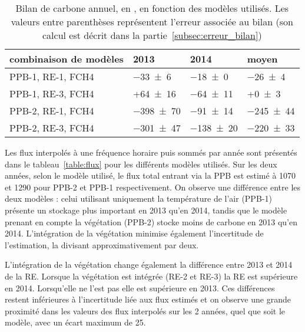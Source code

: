 \begin{table}
\centering
\caption{Bilan de carbone annuel, en \si{\gcma}, en fonction des modèles utilisés. Les valeurs entre parenthèses représentent l'erreur associée au bilan (son calcul est décrit dans la partie~\ref{subsec:erreur_bilan})}
\label{table:bdc}
\begin{tabular}{llll}\toprule
combinaison de modèles & 2013 & 2014 & moyen \\ \midrule
PPB-1, RE-1, FCH4 &  \num{-33(6)} & \num{-18(0)} & \num{-26(4)} \\
PPB-1, RE-3, FCH4 &  +\num{64(16)} & \num{-64(11)} & +\num{0(3)} \\
PPB-2, RE-1, FCH4 &  \num{-398(70)} & \num{-91(14)} & \num{-245(44)} \\
PPB-2, RE-3, FCH4 &  \num{-301(47)} & \num{-138(20)} & \num{-220(33)} \\
\bottomrule
\end{tabular}
\end{table}

Les flux interpolés à une fréquence horaire puis sommés par année sont présentés dans le tableau~\ref{table:flux} pour les différents modèles utilisés.
Sur les deux années, selon le modèle utilisé, le flux total entrant via la PPB est estimé à 1070 et \SI{1290}{\gcma} pour PPB-2 et PPB-1 respectivement.
On observe une différence entre les deux modèles : 
celui utilisant uniquement la température de l'air (PPB-1) présente un stockage plus important en 2013 qu'en 2014, tandis que le modèle prenant en compte la végétation (PPB-2) stocke moins de carbone en 2013 qu'en 2014.
L'intégration de la végétation minimise également l'incertitude de l'estimation, la divisant approximativement par deux.

L'intégration de la végétation change également la différence entre 2013 et 2014 de la RE.
Lorsque la végétation est intégrée (RE-2 et RE-3) la RE est supérieure en 2014.
Lorsqu'elle ne l'est pas elle est supérieure en 2013.
Ces différences restent inférieures à l'incertitude liée aux flux estimés et on observe une grande proximité dans les valeurs des flux interpolés sur les 2 années, quel  que soit le modèle, avec un écart maximum de \SI{25}{\gcma}.


